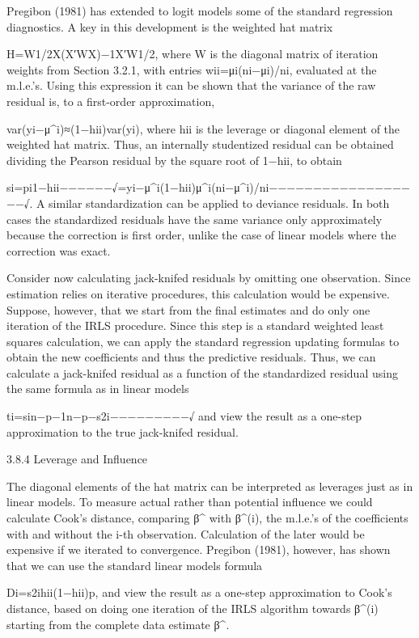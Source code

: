 Pregibon (1981) has extended to logit models some of the standard regression diagnostics. A key in this development is the weighted hat matrix

H=W1/2X(X′WX)−1X′W1/2,
where W is the diagonal matrix of iteration weights from Section 3.2.1, with entries wii=μi(ni−μi)/ni, evaluated at the m.l.e.’s. Using this expression it can be shown that the variance of the raw residual is, to a first-order approximation,

var(yi−μ^i)≈(1−hii)var(yi),
where hii is the leverage or diagonal element of the weighted hat matrix. Thus, an internally studentized residual can be obtained dividing the Pearson residual by the square root of 1−hii, to obtain

si=pi1−hii−−−−−−√=yi−μ^i(1−hii)μ^i(ni−μ^i)/ni−−−−−−−−−−−−−−−−−−√.
A similar standardization can be applied to deviance residuals. In both cases the standardized residuals have the same variance only approximately because the correction is first order, unlike the case of linear models where the correction was exact.

Consider now calculating jack-knifed residuals by omitting one observation. Since estimation relies on iterative procedures, this calculation would be expensive. Suppose, however, that we start from the final estimates and do only one iteration of the IRLS procedure. Since this step is a standard weighted least squares calculation, we can apply the standard regression updating formulas to obtain the new coefficients and thus the predictive residuals. Thus, we can calculate a jack-knifed residual as a function of the standardized residual using the same formula as in linear models

ti=sin−p−1n−p−s2i−−−−−−−−−√
and view the result as a one-step approximation to the true jack-knifed residual.

3.8.4 Leverage and Influence

The diagonal elements of the hat matrix can be interpreted as leverages just as in linear models. To measure actual rather than potential influence we could calculate Cook’s distance, comparing β^ with β^(i), the m.l.e.’s of the coefficients with and without the i-th observation. Calculation of the later would be expensive if we iterated to convergence. Pregibon (1981), however, has shown that we can use the standard linear models formula

Di=s2ihii(1−hii)p,
and view the result as a one-step approximation to Cook’s distance, based on doing one iteration of the IRLS algorithm towards β^(i) starting from the complete data estimate β^.

